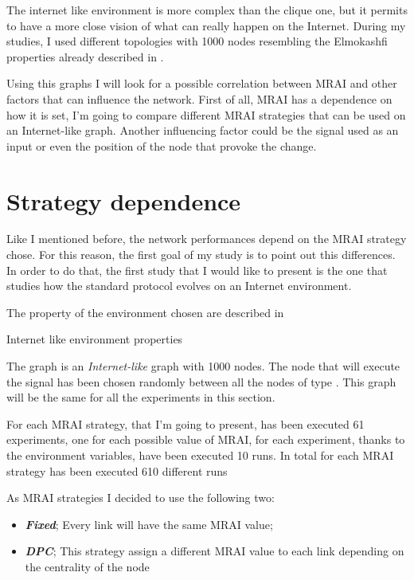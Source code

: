 The internet like environment is more complex than the clique one, but it permits
to have a more close vision of what can really happen on the Internet.
During my studies, I used different topologies with \num{1000} nodes resembling
the Elmokashfi properties \cite{elmokashfi2010scalability} already
described in .

Using this graphs I will look for a possible correlation between \ac{MRAI} and other
factors that can influence the network.
First of all, \ac{MRAI} has a dependence on how it is set, I'm going to compare
different \ac{MRAI} strategies that can be used on an Internet-like graph.
Another influencing factor could be the signal used as an input or even the position
of the node that provoke the change.

\section{Strategy dependence}
\label{sec:bgp_mrai_strategy_dependance}

Like I mentioned before, the network performances depend on the \ac{MRAI} strategy
chose.
For this reason, the first goal of my study is to point out this differences.
In order to do that, the first study that I would like to present is the one
that studies how the standard protocol evolves on an Internet environment.

The property of the environment chosen are described in 

\begin{table}[h]
	
	\caption{Internet like environment properties}
	\label{tbl:internet_like_properties}
\end{table}

The graph is an \textit{Internet-like} graph with \num{1000} nodes.
The node that will execute the signal has been chosen randomly between
all the nodes of type .
This graph will be the same for all the experiments in this section.

For each \ac{MRAI} strategy, that I'm going to present, has been executed \num{61}
experiments, one for each possible value of \ac{MRAI}, for each experiment,
thanks to the environment variables, have been executed \num{10} runs.
In total for each \ac{MRAI} strategy has been executed \num{610} different runs

As \ac{MRAI} strategies I decided to use the following two:
\begin{itemize}
	\item \textbf{\textit{Fixed}}; Every link will have the same
		\ac{MRAI} value;
	\item \textbf{\textit{DPC}}; This strategy assign a different
		\ac{MRAI} value to each link depending on the centrality of the node \cite{milani2020improving}
\end{itemize}

